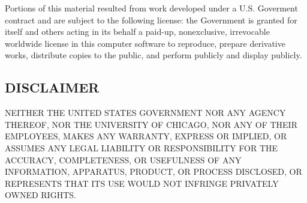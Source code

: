 Portions of this material resulted from work developed under a
U.S. Goverment contract and are subject to the following license: the
Government is granted for itself and others acting in its behalf a
paid-up, nonexclusive, irrevocable worldwide license in this computer
software to reproduce, prepare derivative works, distribute copies to
the public, and perform publicly and display publicly.

\subsection*{DISCLAIMER}%

NEITHER THE UNITED STATES GOVERNMENT NOR ANY AGENCY THEREOF, NOR THE
UNIVERSITY OF CHICAGO, NOR ANY OF THEIR EMPLOYEES, MAKES ANY WARRANTY,
EXPRESS OR IMPLIED, OR ASSUMES ANY LEGAL LIABILITY OR RESPONSIBILITY
FOR THE ACCURACY, COMPLETENESS, OR USEFULNESS OF ANY INFORMATION,
APPARATUS, PRODUCT, OR PROCESS DISCLOSED, OR REPRESENTS THAT ITS USE
WOULD NOT INFRINGE PRIVATELY OWNED RIGHTS.

